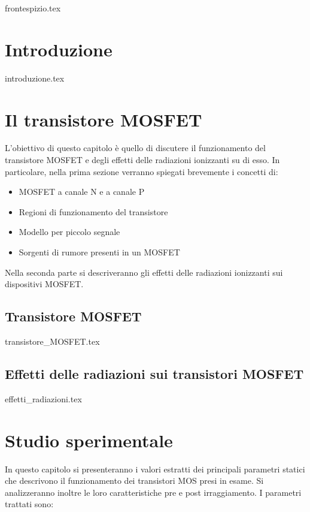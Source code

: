 \documentclass[
	a4paper,
	cleardoublepage=empty,
	headings=twolinechapter,
	numbers=autoenddot,
]{scrbook}
\begin{document}
\frontmatter

{frontespizio.tex}

\tableofcontents
\listoffigures

\listoftables 
\mainmatter

\chapter*{Introduzione}
{introduzione.tex}

\chapter{Il transistore MOSFET}
\label{cap1}
L'obiettivo di questo capitolo è quello di discutere il funzionamento del transistore MOSFET e degli effetti delle radiazioni ionizzanti su di esso. In particolare, nella prima sezione verranno spiegati brevemente i concetti di:
\begin{itemize}     
\item MOSFET a canale N e a canale P
\item Regioni di funzionamento del transistore
\item Modello per piccolo segnale
\item Sorgenti di rumore presenti in un MOSFET
\end{itemize}
Nella seconda parte si descriveranno gli effetti delle radiazioni ionizzanti sui dispositivi MOSFET.

\section{Transistore MOSFET}
{transistore_MOSFET.tex}

\section{Effetti delle radiazioni sui transistori MOSFET}
{effetti_radiazioni.tex}


\chapter{Studio sperimentale}
\label{cap2}
In questo capitolo si presenteranno i valori estratti dei principali parametri statici che descrivono il funzionamento dei transistori MOS presi in esame. Si analizzeranno inoltre le loro caratteristiche pre e post irraggiamento. I parametri trattati sono:
\end{document}
